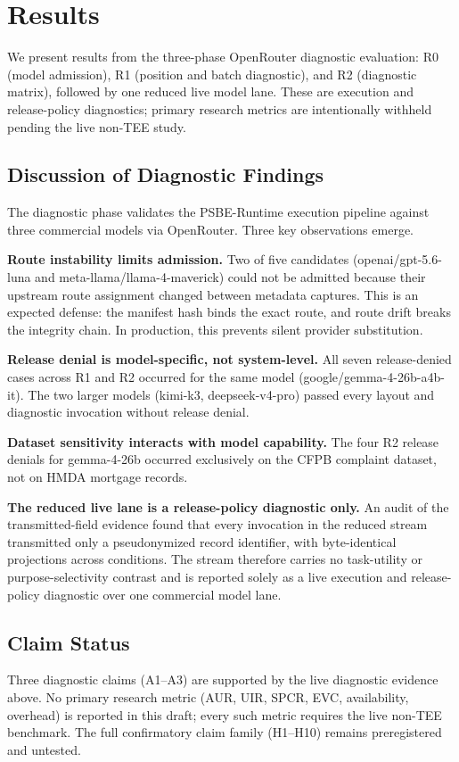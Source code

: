 \section{Results}

We present results from the three-phase OpenRouter diagnostic evaluation:
R0 (model admission), R1 (position and batch diagnostic), and R2
(diagnostic matrix), followed by one reduced live model lane. These are
execution and release-policy diagnostics; primary research metrics are
intentionally withheld pending the live non-TEE study.



\subsection{Discussion of Diagnostic Findings}

The diagnostic phase validates the PSBE-Runtime execution pipeline against
three commercial models via OpenRouter. Three key observations emerge.

\textbf{Route instability limits admission.} Two of five candidates
(openai/gpt-5.6-luna and meta-llama/llama-4-maverick) could not be admitted
because their upstream route assignment changed between metadata captures.
This is an expected defense: the manifest hash binds the exact route, and
route drift breaks the integrity chain. In production, this prevents silent
provider substitution.

\textbf{Release denial is model-specific, not system-level.} All seven
release-denied cases across R1 and R2 occurred for the same model
(google/gemma-4-26b-a4b-it). The two larger models (kimi-k3, deepseek-v4-pro)
passed every layout and diagnostic invocation without release denial.

\textbf{Dataset sensitivity interacts with model capability.} The four
R2 release denials for gemma-4-26b occurred exclusively on the CFPB
complaint dataset, not on HMDA mortgage records.

\textbf{The reduced live lane is a release-policy diagnostic only.} An audit
of the transmitted-field evidence found that every invocation in the reduced
stream transmitted only a pseudonymized record identifier, with
byte-identical projections across conditions. The stream therefore carries
no task-utility or purpose-selectivity contrast and is reported solely as a
live execution and release-policy diagnostic over one commercial model lane.

\subsection{Claim Status}

Three diagnostic claims (A1--A3) are supported by the live diagnostic
evidence above. No primary research metric (AUR, UIR, SPCR, EVC,
availability, overhead) is reported in this draft; every such metric
requires the live non-TEE benchmark. The full confirmatory claim family
(H1--H10) remains preregistered and untested.
